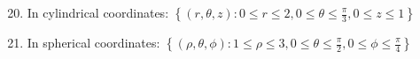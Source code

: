 \documentclass[12pt]{article}
\begin{document}

\begin{enumerate}
\setcounter{enumi}{19}

\item In cylindrical coordinates: $\left\{(r,\theta,z): 0 \leq r \leq 2, 0 \leq \theta \leq \frac{\pi}{3}, 0 \leq z \leq 1\right\}$

\item In spherical coordinates: $\left\{(\rho,\theta,\phi): 1 \leq \rho \leq 3, 0 \leq \theta \leq \frac{\pi}{2}, 0 \leq \phi \leq \frac{\pi}{4}\right\}$

\end{enumerate}
\end{document}
